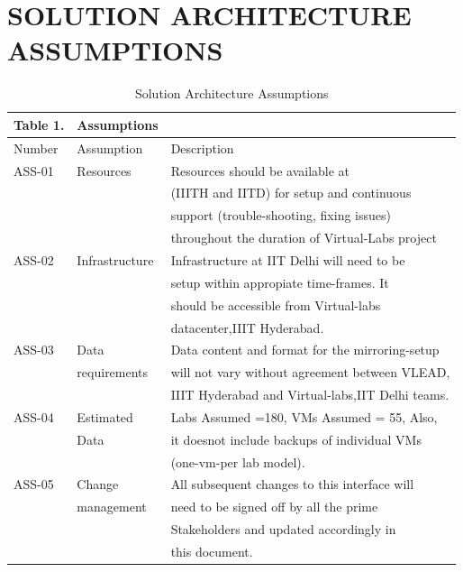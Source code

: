 \documentclass[11pt]{article}
\begin{document}
\section{SOLUTION ARCHITECTURE ASSUMPTIONS}
\label{sec-6}



\begin{table}[H]
\caption{\label{tbl:Assumptions}Solution Architecture Assumptions}
\begin{center}
\begin{tabular}{lll}
\hline
 Table 1.  &  Assumptions     &                                                    \\
\hline
 Number    &  Assumption      &  Description                                       \\
\hline
 ASS-01    &  Resources       &  Resources should be available at                  \\
           &                  &  (IIITH and IITD) for setup and continuous         \\
           &                  &  support (trouble-shooting, fixing issues)         \\
           &                  &  throughout the duration of Virtual-Labs project   \\
 ASS-02    &  Infrastructure  &  Infrastructure at IIT Delhi will need to be       \\
           &                  &  setup within appropiate time-frames. It           \\
           &                  &  should be accessible from Virtual-labs            \\
           &                  &  datacenter,IIIT Hyderabad.                        \\
 ASS-03    &  Data            &  Data content and format for the mirroring-setup   \\
           &  requirements    &  will not vary without agreement between VLEAD,    \\
           &                  &  IIIT Hyderabad and Virtual-labs,IIT Delhi teams.  \\
 ASS-04    &  Estimated       &  Labs Assumed =180, VMs Assumed = 55, Also,        \\
           &  Data            &  it doesnot include backups of individual VMs      \\
           &                  &  (one-vm-per lab model).                           \\
 ASS-05    &  Change          &  All subsequent changes to this interface will     \\
           &  management      &  need to be signed off by all the prime            \\
           &                  &  Stakeholders and updated accordingly in           \\
           &                  &  this document.                                    \\
\hline
\end{tabular}
\end{center}
\end{table}
\end{document}
